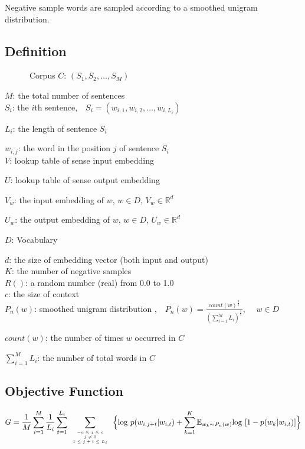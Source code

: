 \documentclass[12pt,a4paper,twoside]{book}
\begin{document}
Negative sample words are sampled according to a smoothed unigram distribution.
\subsection{Definition}
\ \ \ \ \ \ Corpus $C$: $(S_1,S_2,\ldots,S_M)$

$M$: the total number of sentences\\

$S_i$: the $i$th sentence,\ \ $S_i = (w_{i,1},w_{i,2},\ldots,w_{i,L_i})$

$L_i$: the length of sentence $S_i$

$w_{i,j}$: the word in the position $j$ of sentence $S_i$\\

$V$: lookup table of sense input embedding 

$U$: lookup table of  sense output embedding 

$V_w$: the input embedding of $w$, $w\in D$, $V_w \in \mathbb{R}^d$

$U_w$: the output embedding of $w$, $w\in D$, $U_w \in \mathbb{R}^d$

$D$: Vocabulary 

$d$: the size of embedding vector (both input and output)\\

$K$: the number of negative samples\\

$R()$: a random number (real) from 0.0 to 1.0\\

$c$: the size of context\\

$P_n(w)$: smoothed unigram distribution ,\ \ $P_n(w) = \frac{count(w)^{\frac{3}{4}}}{(\sum_{i=1}^M L_i)^{\frac{3}{4}}}$, \ \ $w\in D$

$count(w)$: the number of times $w$ occurred in $C$

$\sum_{i=1}^M L_i$: the number of total words in $C$
\subsection{Objective Function}
\begin{equation}
\begin{split}
G = \frac{1}{M}\sum_{i=1}^M\frac{1}{L_i}\sum_{t=1}^{L_i}\sum\limits_{\mbox{\tiny$\begin{array}{c}-c\leq j \leq c\\ j\neq 0\\ 1\leq j+t\leq L_i\end{array}$}}\Big \{\mathrm{log}\ p(w_{i,j+t}|w_{i,t}) 
+\sum\limits_{k=1}^K\mathbb{E}_{w_k\sim P_n(w)}\mathrm{log}\ [1-p(w_k|w_{i,t}) ] \Big \}
\end{split}
\end{equation} 
\end{document}
